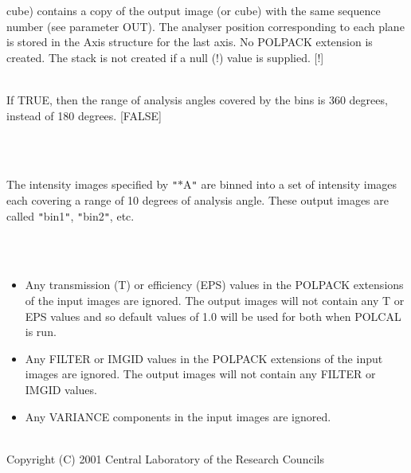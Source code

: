 \documentclass[twoside,11pt]{article}
\renewcommand{\_}{\texttt{\symbol{95}}}
\newlength{\sstexampleslength}
\newcommand{\sstexamples}[1]{
   \item[Examples:] \mbox{} \\
   \vspace{-3.5ex}
   \begin{description}
      #1
   \end{description}
}
\newcommand{\sstsubsection}[1]{ \item[{#1}] \mbox{} \\}
\newcommand{\sstexamplesubsection}[2]{\sloppy
\item[\parbox{\sstexampleslength}{\ssttt #1}] \mbox{} \vspace{1.0ex}
\\ #2 }
\newcommand{\sstnotes}[1]{\item[Notes:] \mbox{} \\[1.3ex] #1}
\newcommand{\sstdiytopic}[2]{\item[{\hspace{-0.35em}#1\hspace{-0.35em}:}]
\mbox{} \\[1.3ex] #2}
\newcommand{\sstitemlist}[1]{
  \mbox{} \\
  \vspace{-3.5ex}
  \begin{itemize}
     #1
  \end{itemize}
}
\newcommand{\sstitem}{\item}
\newcommand{\sstexamples}[1]{
      \item[Examples:] \\
      \begin{description}
         #1
      \end{description}
      \\
   }
\newcommand{\sstsubsection}[1]{\item[{#1}]}
\newcommand{\sstexamplesubsection}[2]{\item[{\ssttt #1}] #2}
\newcommand{\sstnotes}[1]{\item[Notes:] #1 }
\newcommand{\sstdiytopic}[2]{\item[{#1}] #2 }
\newcommand{\sstitemlist}[1]{
      \begin{itemize}
         #1
      \end{itemize}
      \\
   }
\newcommand{\sstitem}{\item}
\begin{document}
{{{         cube) contains a copy of the output image (or cube) with the same
         sequence number (see parameter OUT). The analyser position
         corresponding to each plane is stored in the Axis structure for the
         last axis. No POLPACK extension is created. The stack is not created
         if a null (!) value is supplied. [!]
      }
      \sstsubsection{
         TWOPI = \_LOGICAL (Read)
      }{
         If TRUE, then the range of analysis angles covered by the bins
         is 360 degrees, instead of 180 degrees. [FALSE]
      }
   }
   \sstexamples{
      \sstexamplesubsection{
         polstack {\tt "}$*$\_A{\tt "} {\tt "}bin$*${\tt "} 10
      }{
         The intensity images specified by {\tt "}$*$\_A{\tt "} are binned into a set
         of intensity images each covering a range of 10 degrees of
         analysis angle. These output images are called {\tt "}bin1{\tt "}, {\tt "}bin2{\tt "},
         etc.
      }
   }
   \sstnotes{
      \sstitemlist{

         \sstitem
         Any transmission (T) or efficiency (EPS) values in the POLPACK
         extensions of the input images are ignored. The output images will
         not contain any T or EPS values and so default values of 1.0 will
         be used for both when POLCAL is run.

         \sstitem
         Any FILTER or IMGID values in the POLPACK extensions of the
         input images are ignored. The output images will not contain any
         FILTER or IMGID values.

         \sstitem
         Any VARIANCE components in the input images are ignored.
      }
   }
   \sstdiytopic{
      Copyright
   }{
      Copyright (C) 2001 Central Laboratory of the Research Councils
   }
}
\newpage
\end{document}
